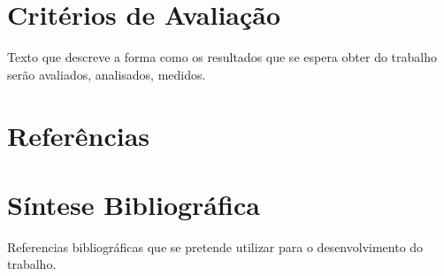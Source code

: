 \documentclass[
    12pt,               %
    a4paper,            %
    english,            %
    brazil,             %
    ]{article}
\begin{document}
\section{Critérios de Avaliação}

Texto que descreve a forma como os resultados que se espera obter do trabalho serão avaliados, analisados, medidos.


\section{Referências}

    \vspace{-4.3em}
    \renewcommand\refname{}

    

\section{Síntese Bibliográfica}

Referencias bibliográficas que se pretende utilizar para o desenvolvimento do trabalho.


\end{document}
